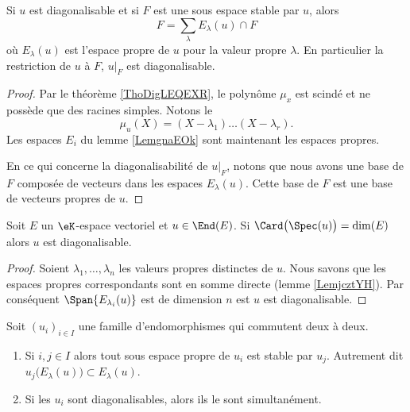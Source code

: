 \begin{corollary}
    Si \( u\) est diagonalisable et si \( F\) est une sous espace stable par \( u\), alors
    \begin{equation}
        F=\sum_{\lambda}E_{\lambda}(u)\cap F
    \end{equation}
    où \( E_{\lambda}(u)\) est l'espace propre de \( u\) pour la valeur propre \( \lambda\). En particulier la restriction de \( u\) à \( F\), \( u|_F\) est diagonalisable.
\end{corollary}

\begin{proof}
    Par le théorème \ref{ThoDigLEQEXR}, le polynôme \( \mu_x\) est scindé et ne possède que des racines simples. Notons le
    \begin{equation}
        \mu_u(X)=(X-\lambda_1)\ldots (X-\lambda_r).
    \end{equation}
    Les espaces \( E_i\) du lemme \ref{LemgnaEOk} sont maintenant les espaces propres.

    En ce qui concerne la diagonalisabilité de \( u|_F\), notons que nous avons une base de \( F\) composée de vecteurs dans les espaces \( E_{\lambda}(u)\). Cette base de \( F\) est une base de vecteurs propres de \( u\).
\end{proof}

\begin{lemma}
    Soit \( E\) un \( \eK\)-espace vectoriel et \( u\in\End(E)\). Si \( \Card\big( \Spec(u) \big)=\dim(E)\) alors \( u\) est diagonalisable.
\end{lemma}

\begin{proof}
    Soient \( \lambda_1,\ldots, \lambda_n\) les valeurs propres distinctes de \( u\). Nous savons que les espaces propres correspondants sont en somme directe (lemme \ref{LemjcztYH}). Par conséquent \( \Span\{ E_{\lambda_i}(u) \}\) est de dimension \( n\) est \( u\) est diagonalisable.
\end{proof}

\begin{proposition}     \label{PropGqhAMei}
    Soit \( (u_i)_{i\in I}\) une famille d'endomorphismes qui commutent deux à deux.
    \begin{enumerate}
        \item       \label{ItemGqhAMei}
            Si \( i,j\in I\) alors tout sous espace propre de \( u_i\) est stable par \( u_j\). Autrement dit \( u_j\big(E_{\lambda}(u)\big)\subset E_{\lambda}(u)\).
        \item
            Si les \( u_i\) sont diagonalisables, alors ils le sont simultanément.
    \end{enumerate}
\end{proposition}

